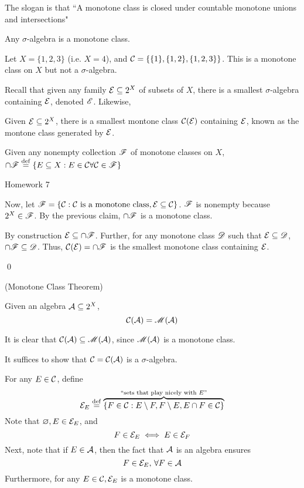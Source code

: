\documentclass[x11names,reqno,14pt]{extarticle}
\begin{document}
The slogan is that ``A monotone class is closed under countable monotone unions and intersections"

\exm

Any $\sigma$-algebra is a monotone class. 

\exm

Let $X = \{1, 2, 3\} $ (i.e. $X = 4$), and $\mathcal{C} = \{\{1\}, \{1, 2\}, \{1, 2, 3\}\}$. This is a monotone class on $X$ but not a $\sigma$-algebra. 

Recall that given any family $\mathcal{E}\subseteq2^X$ of subsets of $X$, there is a smallest $\sigma$-algebra containing $\mathcal{E}$, denoted $\mathscr{E}$. Likewise, 

\prop

Given $\mathcal{E}\subseteq 2^X$, there is a smallest montone class $\mathcal{C}(\mathcal{E})$ containing $\mathcal{E}$, known as the montone class generated by $\mathcal{E}$. 

\proof

\claim 

Given any nonempty collection $\mathscr{F}$ of monotone classes on $X$, $\cap \mathscr{F}\overset{\mathrm{def}}{=} \{E\subseteq X : E\in\mathcal{C}\forall\mathcal{C}\in\mathscr{F}\}$

\proof Homework 7

Now, let $\mathscr{F} = \{\mathcal{C}:\mathcal{C}\text{ is a monotone class}, \mathcal{E}\subseteq\mathcal{C}\}$. $\mathscr{F}$ is nonempty because $2^X\in\mathscr{F}$. By the previous claim, $\cap\mathscr{F}$ is a monotone class. 

By construction $\mathcal{E}\subseteq\cap\mathscr{F}$. Further, for any monotone class $\mathscr{D}$ such that $\mathcal{E}\subseteq\mathscr{D}$, $\cap\mathscr{F}\subseteq\mathscr{D}$. Thus, $\mathcal{C}(\mathcal{E}) = \cap\mathscr{F}$ is the smallest monotone class containing $\mathcal{E}$. 

\qed

\thm (Monotone Class Theorem)

Given an algebra $\mathcal{A}\subseteq2^X$, 
\[
\mathcal{C}(\mathcal{A}) = \mathscr{M}(\mathcal{A})
\]

\rem 

It is clear that $\mathcal{C}(\mathcal{A}) \subseteq \mathscr{M}(\mathcal{A})$, since $\mathscr{M}(\mathcal{A})$ is a monotone class. 
 
\proof

It suffices to show that $\mathcal{C} = \mathcal{C}(\mathcal{A})$ is a $\sigma$-algebra. 

For any $E\in\mathcal{C}$, define
\[
\mathcal{E}_E \overset{\mathrm{def}}{=} \overbrace{\{F\in\mathcal{C}: E\setminus F, F \setminus E, E \cap F \in \mathcal{C}\}}^{\text{``sets that play nicely with }E"}
\]
Note that $\varnothing, E \in \mathcal{E}_E$, and 
\[
F\in\mathcal{E}_E \iff E \in \mathcal{E}_F
\]
Next, note that if $E \in \mathcal{A}$, then the fact that $\mathcal{A}$ is an algebra ensures
\[
F\in\mathcal{E}_E,\,\forall F\in\mathcal{A}
\]
Furthermore, for any $E \in \mathcal{C}, \mathcal{E}_E$ is a monotone class. 
\end{document}
